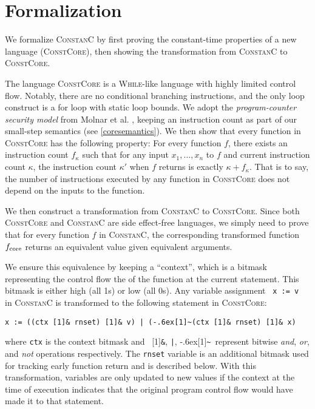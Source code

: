 \newcommand{\constc}{\textsc{ConstanC}\@\xspace}
\newcommand{\ccore}{\textsc{ConstCore}\@\xspace}
\newcommand{\bnot}{\raise-.6ex\hbox{\scalebox{1.1}[1]{\texttt{\~}}}\@}
\newcommand{\band}{\scalebox{1.25}[1]{\texttt{\&}}\@\xspace}
\newcommand{\bor}{\texttt{|}\@\xspace}
\newcommand{\bandx}{\,\scalebox{1.25}[1]{\texttt{\&}}\,}
\newcommand{\borx}{\,\texttt{|}\,}


\section{Formalization}
\label{sec:formalization}

We formalize \constc by first proving the constant-time properties of a new
language (\ccore), then showing the transformation from \constc to \ccore.

The language \ccore is a \textsc{While}-like language with highly limited
control flow. Notably, there are no conditional branching instructions, and the
only loop construct is a for loop with static loop bounds. We adopt the
\emph{program-counter security model} from Molnar et al. \cite{pcsecmodel},
keeping an instruction count as part of our small-step semantics (see
\autoref{coresemantics}). We then show that every function in \ccore has the
following property: For every function $f$, there exists an instruction count
$f_\kappa$ such that for any input $x_1,\dots,x_n$ to $f$ and current
instruction count $\kappa$, the instruction count $\kappa'$ when $f$ returns is
exactly $\kappa + f_\kappa$. That is to say, the number of instructions executed
by any function in \ccore does not depend on the inputs to the function.

We then construct a transformation from \constc to \ccore. Since both \ccore and
\constc are side effect-free languages, we simply need to prove that for every
function $f$ in \constc, the corresponding transformed function
$f_{\textnormal{core}}$ returns an equivalent value given equivalent arguments.

We ensure this equivalence by keeping a ``context'', which is a bitmask
representing the control flow the of the function at the current statement. This
bitmask is either high (all 1s) or low (all 0s).  Any variable assignment
~\texttt{x := v}~ in \constc is transformed to the following statement in
\ccore:
\begin{center}
  \texttt{x := ((ctx\bandx rnset)\bandx v)\borx(\bnot (ctx\bandx rnset)\bandx x)}
\end{center}
where \texttt{ctx} is the context bitmask and ~\band, \bor, \bnot\ represent
bitwise \emph{and}, \emph{or}, and \emph{not} operations respectively. The
\texttt{rnset} variable is an additional bitmask used for tracking early
function return and is described below.  With this transformation, variables are
only updated to new values if the context at the time of execution indicates
that the original program control flow would have made it to that statement.

